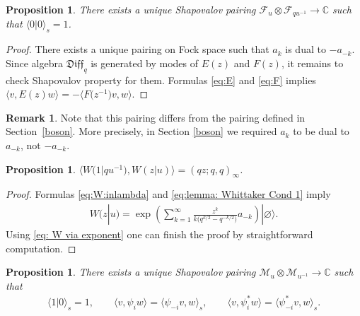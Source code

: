 \documentclass[pdftex]{sigma}
\numberwithin{equation}{section}
\newtheorem{Proposition}[Theorem]{Proposition}
\theoremstyle{definition}
\newtheorem{Remark}[Theorem]{Remark}
\newcommand{\qD}{\mathfrak{Diff}_q}
\begin{document}
\begin{Proposition} \label{prop: Sapovalov p for Fock}
There exists a unique Shapovalov pairing $\mathcal{F}_{u} \otimes \mathcal{F}_{q u^{-1}} \rightarrow \mathbb{C}$ such that $\langle 0 | 0 \rangle_s \allowbreak =1$.
\end{Proposition}

\begin{proof}
There exists a unique pairing on Fock space such that $a_k$ is dual to $-a_{-k}$. Since algebra $\qD$ is generated by modes of $E(z)$ and $F(z)$, it remains to check Shapovalov property for them. Formulas \eqref{eq:E} and \eqref{eq:F} implies $\langle v, E(z) w \rangle = -\big\langle F\big(z^{-1}\big) v, w \big\rangle$.
\end{proof}

\begin{Remark}Note that this pairing differs from the pairing defined in Section~\ref{boson}. More precisely, in Section \ref{boson} we required $a_k$ to be dual to $a_{-k}$, not $-a_{-k}$.
\end{Remark}

\begin{Proposition} \label{prop: U(1) Poch}
$\big\langle W\big(1| q u^{-1}\big), W(z|u) \big\rangle = (qz;q,q)_{\infty}$.
\end{Proposition}

\begin{proof}
Formulas \eqref{eq:W:inlambda} and \eqref{eq:lemma: Whittaker Cond 1} imply
\begin{gather} \label{eq: W via exponent}
W(z|u) =
\exp\left(\sum_{k=1}^\infty \frac{z^k}{k\big(q^{k/2}-q^{-k/2}\big)}a_{-k}\right)|\varnothing\rangle.
\end{gather}
Using \eqref{eq: W via exponent} one can finish the proof by straightforward computation.
\end{proof}

\begin{Proposition} \label{prop: Sapovalov p for Fermion}
There exists a unique Shapovalov pairing $\mathcal{M}_{u} \otimes \mathcal{M}_{u^{-1}} \rightarrow \mathbb{C}$ such that
\begin{gather} \label{eq: Fermion and Shapoval}
\langle 1 | 0 \rangle_s =1, \qquad \langle v, \psi_i w \rangle = \langle \psi_{-i} v, w \rangle_s, \qquad \langle v, \psi^*_i w \rangle = \langle \psi^*_{-i} v, w \rangle_s.
\end{gather}
\end{Proposition}
\end{document}

